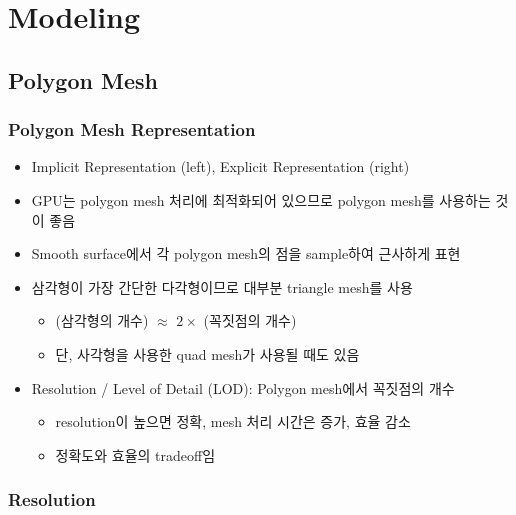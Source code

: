 \section{Modeling}

\subsection{Polygon Mesh}

\subsubsection*{Polygon Mesh Representation}
\begin{itemize}
    \item Implicit Representation (left), Explicit Representation (right)
    \begin{figures}
    \end{figures}
    \item GPU는 polygon mesh 처리에 최적화되어 있으므로 polygon mesh를 사용하는 것이 좋음
    \item Smooth surface에서 각 polygon mesh의 점을 sample하여 근사하게 표현
    \item 삼각형이 가장 간단한 다각형이므로 대부분 triangle mesh를 사용
    \begin{itemize}
        \item (삼각형의 개수) $\approx$ $2 \times $ (꼭짓점의 개수)
        \item 단, 사각형을 사용한 quad mesh가 사용될 때도 있음
    \end{itemize}
    \item Resolution / Level of Detail (LOD): Polygon mesh에서 꼭짓점의 개수
    \begin{itemize}
        \item resolution이 높으면 정확, mesh 처리 시간은 증가, 효율 감소
        \item 정확도와 효율의 tradeoff임
    \end{itemize}
\end{itemize}

\subsubsection*{Resolution}
